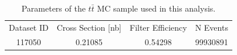 \begin{table}
   \caption{Parameters of the $t\bar{t}$ MC sample used in this analysis. \label{tab:ttbar_params} }
    \begin{tabular}{ c c c c }
    Dataset ID & Cross Section [nb] & Filter Efficiency & N Events \\
    117050     & 0.21085        & 0.54298    & 99930891 \\
    \end{tabular}
\end{table}







